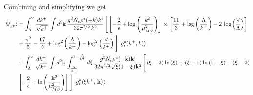 \documentclass[aps,prd,amsmath,amssymb,nofootinbib]{revtex4-2}
\numberwithin{equation}{section}
\begin{document}
Combining and simplifying we get
\begin{align}\label{combinedgrho}
     \left|\Psi_{g\rho}\right\rangle & =  \int_{\Lambda}^{\vee}\frac{dk^{+}}{\sqrt{k^{+}}}\,\int d^{2}\mathbf{k}\,\frac{g^{3}N_{c}\rho^{a}(-k)k^{i}}{32\pi^{7/2}\,k^{2}}\,\Bigg[\left[-\frac{2}{\epsilon}+\log{\left(\frac{k^{2}}{\mu^{2}_{\overline{MS}}}\right)}\right]\times\, \left[\frac{11}{3}+\log{\left(\frac{\Lambda}{k^{+}}\right)}-2\,\log{\left(\frac{\vee}{\Lambda}\right)}\right]\notag \\ & + \frac{\pi^{2}}{3} - \frac{67}{9} +\log^{2}\left(\frac{\Lambda}{k^{+}}\right)-\log^{2}\left(\frac{\vee}{k^{+}}\right)\Bigg] \ket{g^{a}_{i}(k^{+},k)}\notag \\ & + \int_{\Lambda}^{\vee}\frac{dk^{+}}{\sqrt{k^{+}}}\,\int d^{2}\mathbf{k}\,\int_{\frac{\Lambda}{k^{+}}}^{1-\frac{\Lambda}{k^{+}}}d\xi\,\frac{g^{3}N_{c}\rho^{a}(-\mathbf{k})\mathbf{k}^{i}}{32\pi^{7/2}\sqrt{\xi}(1-\xi)\mathbf{k}^{2}}\Bigg[\left(\xi-2\right)\ln\left(\xi\right)+\left(\xi+1\right)\ln\left(1-\xi\right)-\left(\xi-2\right)\notag \\ & \left[-\frac{2}{\epsilon}+\ln\left(\frac{\mathbf{k}^{2}}{\mu_{\overline{MS}}^{2}}\right)\right]\Bigg]\left|g_{i}^{a}(\xi k^{+},\, \mathbf{k})\right\rangle.
\end{align}
\end{document}
